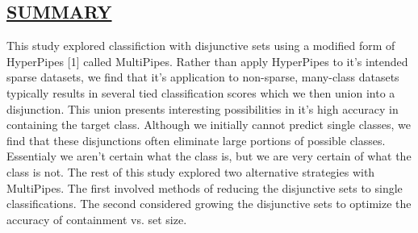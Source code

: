 \begin{kasten}
    \section*{ \hspace{0.1cm} {\color{red} \underline{SUMMARY}}}
    \Large{

\hspace{6mm}This study explored classifiction with disjunctive sets using a modified form of HyperPipes [1] called MultiPipes. Rather than apply HyperPipes to it's intended sparse datasets, we find that it's application to non-sparse, many-class datasets typically results in several tied classification scores which we then union into a disjunction. This union presents interesting possibilities in it's high accuracy in containing the target class. Although we initially cannot predict single classes, we find that these disjunctions often eliminate large portions of possible classes. Essentialy we aren't certain what the class is, but we are very certain of what the class is not. The rest of this study explored two alternative strategies with MultiPipes. The first involved methods of reducing the disjunctive sets to single classifications. The second considered growing the disjunctive sets to optimize the accuracy of containment vs. set size.
    }
\end{kasten}

